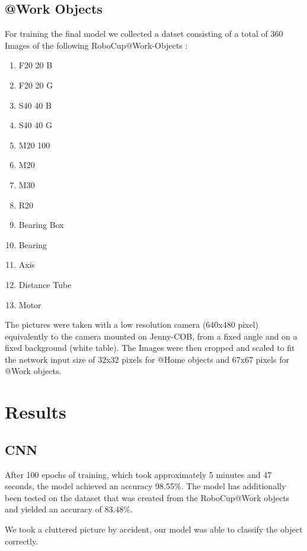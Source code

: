 \documentclass[	DIV=calc,%
				paper=a4,%
				fontsize=11pt,%
				twocolumn]{scrartcl}	 %
\begin{document}
\subsection*{@Work Objects}
For training the final model we collected a datset consisting of a total of 360 Images of the following RoboCup@Work-Objects \cite{robocup_atwork_rulebook}:
\begin{enumerate}
    \setlength\itemsep{-0.25em}
	\item F20 20 B
	\item F20 20 G
	\item S40 40 B 
	\item S40 40 G
	\item M20 100 
	\item M20 
	\item M30
	\item R20
	\item Bearing Box
	\item Bearing
	\item Axis
	\item Distance Tube 
	\item Motor 
\end{enumerate}

The pictures were taken with a low resolution camera (640x480 pixel) equivalently to the camera mounted on Jenny-COB, from a fixed angle and on a fixed background (white table).
The Images were then cropped and scaled to fit the network input size of 32x32 pixels for @Home objects and 67x67 pixels for @Work objects.

\section{Results}

\subsection*{CNN}
After 100 epochs of training, which took approximately 5 minutes and 47 seconds, the model achieved an accuracy 98.55\%. The model has additionally been tested on the dataset that was created from the RoboCup@Work objects and yielded an accuracy of 83.48\%.

We took a cluttered picture by accident, our model was able to classify the object correctly.
\end{document}
